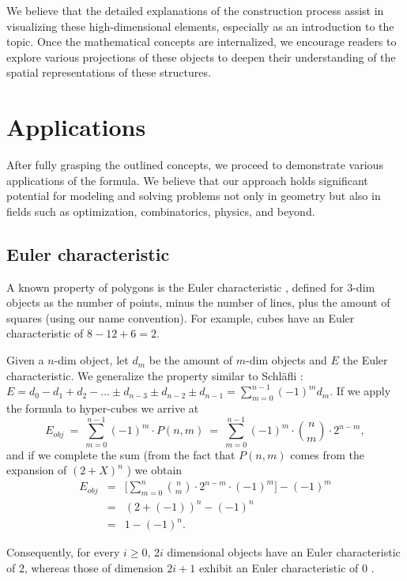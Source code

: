 \documentclass{article}
\begin{document}
	We believe that the detailed explanations of the construction process assist in visualizing these high-dimensional elements, especially as an introduction to the topic. Once the mathematical concepts are internalized, we encourage readers to explore various projections of these objects to deepen their understanding of the spatial representations of these structures.
	
	\section{Applications \label{sec:apps}}
	After fully grasping the outlined concepts, we proceed to demonstrate various applications of the formula. We believe that our approach holds significant potential for modeling and solving problems not only in geometry but also in fields such as optimization, combinatorics, physics, and beyond.
	
	\subsection{Euler characteristic \label{sec:euler}}
	
	A known property of polygons is the Euler characteristic \cite{euler,zieglerLectures}, defined for $3$-dim objects as the number of points, minus the number of lines, plus the amount of squares (using our name convention). For example, cubes have an Euler characteristic of $8 - 12 + 6 = 2$.
	
	Given a $n$-dim object, let $d_m$ be the amount of $m$-dim objects and $E$ the Euler characteristic. We generalize the property similar to Schläfli \cite{coxeter1973regular}: $E=d_{0}-d_{1}+d_{2}- ... \pm d_{n-3}\pm d_{n-2}\pm d_{n-1} = \sum_{m=0}^{n-1}(-1)^{m}d_{m}$. If we apply the formula to hyper-cubes we arrive at
	$$E_{obj} \ = \ \sum_{m=0}^{n-1}(-1)^{m} \cdot P(n,m)\ =\ \sum_{m=0}^{n-1}(-1)^{m} \cdot \binom{n}{m} \cdot 2^{n-m},$$
	and if we complete the sum (from the fact that $P(n,m)$ comes from the expansion of $(2 + X)^{n}$ \cite{coxeter1973regular}) we obtain
	\begin{eqnarray*}
		E_{obj} & = & \Bigg[\sum_{m=0}^{n} \binom{n}{m} \cdot 2^{n-m} \cdot (-1)^{m}\Bigg] - (-1)^m\\
		& = & (2 + (-1))^{n}-(-1)^{n}\\
		& = & 1-(-1)^{n}.
	\end{eqnarray*}
	
	Consequently, for every $i \geq 0$, $2i$ dimensional objects have an Euler characteristic of $2$, whereas those of dimension $2i+1$ exhibit an Euler characteristic of $0$ \cite{coxeter1973regular}.
	
\end{document}

